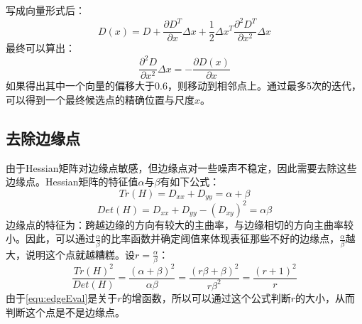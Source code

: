       写成向量形式后：
      \begin{equation}
        D(x)=D+\frac{\partial D^T}{\partial x}\Delta x+\frac{1}{2}\Delta x^T\frac{\partial^2D^T}{\partial x^2}\Delta x
      \end{equation}
      最终可以算出：
      \begin{equation}
        \frac{\partial^2D}{\partial x^2}\Delta x=-\frac{\partial D(x)}{\partial x}
      \end{equation}
      如果得出其中一个向量的偏移大于0.6，则移动到相邻点上。通过最多5次的迭代，可以得到一个最终候选点的精确位置与尺度$\hat{x}$。
    \subsection{去除边缘点}
      由于Hessian矩阵对边缘点敏感，但边缘点对一些噪声不稳定\cite{ericsson2003affine}，因此需要去除这些边缘点。Hessian矩阵的特征值$\alpha$与$\beta$有如下公式：
      \begin{equation}
        Tr(H)=D_{xx}+D_{yy}=\alpha+\beta
      \end{equation}
      \begin{equation}
        Det(H)=D_{xx}+D_{yy}-\left(D_{xy}\right)^2=\alpha\beta
      \end{equation}
      边缘点的特征为：跨越边缘的方向有较大的主曲率，与边缘相切的方向主曲率较小。因此，可以通过$\frac{\alpha}{\beta}$的比率函数并确定阈值来体现表征那些不好的边缘点，$\frac{\alpha}{\beta}$越大，说明这个点就越糟糕。设$r=\frac{\alpha}{\beta}$：
      \begin{equation}
        \label{equ:edgeEval}
        \frac{Tr(H)^2}{Det(H)}=\frac{\left(\alpha+\beta\right)^2}{\alpha\beta}=\frac{\left(r\beta+\beta\right)^2}{r\beta^2}=\frac{\left(r+1\right)^2}{r}
      \end{equation}
      由于\ref{equ:edgeEval}是关于$r$的增函数，所以可以通过这个公式判断$r$的大小，从而判断这个点是不是边缘点。
